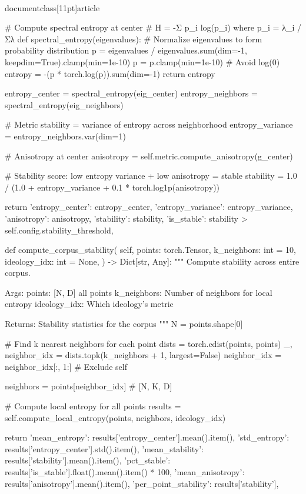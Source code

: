 \\documentclass[11pt]{article}
\begin{document}
\begin{CodeBlock}
        # Compute spectral entropy at center
        # H = -Σ p_i log(p_i) where p_i = λ_i / Σλ
        def spectral_entropy(eigenvalues):
            # Normalize eigenvalues to form probability distribution
            p = eigenvalues / eigenvalues.sum(dim=-1, keepdim=True).clamp(min=1e-10)
            p = p.clamp(min=1e-10)  # Avoid log(0)
            entropy = -(p * torch.log(p)).sum(dim=-1)
            return entropy

        entropy_center = spectral_entropy(eig_center)
        entropy_neighbors = spectral_entropy(eig_neighbors)

        # Metric stability = variance of entropy across neighborhood
        entropy_variance = entropy_neighbors.var(dim=1)

        # Anisotropy at center
        anisotropy = self.metric.compute_anisotropy(g_center)

        # Stability score: low entropy variance + low anisotropy = stable
        stability = 1.0 / (1.0 + entropy_variance + 0.1 * torch.log1p(anisotropy))

        return {
            'entropy_center': entropy_center,
            'entropy_variance': entropy_variance,
            'anisotropy': anisotropy,
            'stability': stability,
            'is_stable': stability > self.config.stability_threshold,
        }

    def compute_corpus_stability(
        self,
        points: torch.Tensor,
        k_neighbors: int = 10,
        ideology_idx: int = None,
    ) -> Dict[str, Any]:
        """
        Compute stability across entire corpus.

        Args:
            points: [N, D] all points
            k_neighbors: Number of neighbors for local entropy
            ideology_idx: Which ideology's metric

        Returns:
            Stability statistics for the corpus
        """
        N = points.shape[0]

        # Find k nearest neighbors for each point
        dists = torch.cdist(points, points)
        _, neighbor_idx = dists.topk(k_neighbors + 1, largest=False)
        neighbor_idx = neighbor_idx[:, 1:]  # Exclude self

        neighbors = points[neighbor_idx]  # [N, K, D]

        # Compute local entropy for all points
        results = self.compute_local_entropy(points, neighbors, ideology_idx)

        return {
            'mean_entropy': results['entropy_center'].mean().item(),
            'std_entropy': results['entropy_center'].std().item(),
            'mean_stability': results['stability'].mean().item(),
            'pct_stable': results['is_stable'].float().mean().item() * 100,
            'mean_anisotropy': results['anisotropy'].mean().item(),
            'per_point_stability': results['stability'],
        }



\end{CodeBlock}
\end{document}
